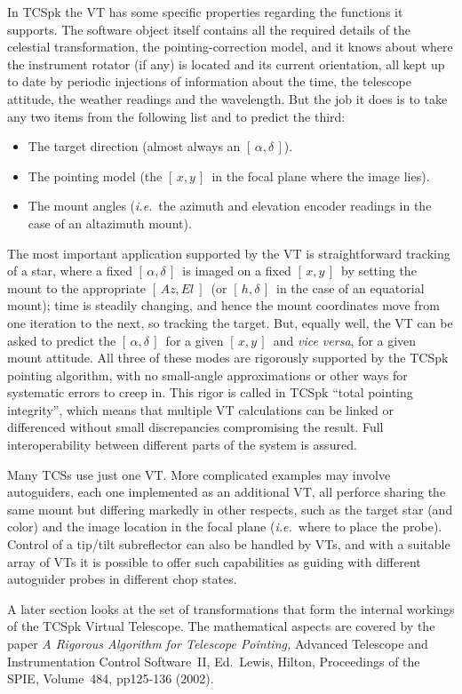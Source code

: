 \documentclass[12pt,fleqn,twoside]{article}
\renewcommand{\_}{{\tt\char'137}}     %
\newcommand{\radec}     {$[\,\alpha,\delta\,]$}
\newcommand{\hadec}     {$[\,h,\delta\,]$}
\newcommand{\azel}      {$[\,Az,El~]$}
\newcommand{\xy}        {$[\,x,y\,]$}
\begin{document}
In TCSpk the VT has some specific properties regarding
the functions it supports.  The software object itself contains all
the required details of the celestial transformation, the
pointing-correction model, and it knows about where the instrument
rotator (if any) is located and its current orientation, all kept
up to date by periodic injections of information about the time,
the telescope attitude, the weather readings and the wavelength.
But the job it
does is to take any two items from the following list and to
predict the third:
\begin{itemize}
\item The target direction (almost always an \radec).
\item The pointing model (the \xy\ in the focal plane where
      the image lies).
\item The mount angles ({\it i.e.}~the azimuth and elevation
      encoder readings in the case of an altazimuth mount).
\end{itemize}
The most important application supported by the VT
is straightforward tracking of a star, where a fixed \radec\ is
imaged on a fixed \xy\ by setting the mount to the appropriate
\azel\ (or \hadec\ in the case of an equatorial mount);  time is
steadily changing, and hence the mount coordinates move from one
iteration to the next, so tracking the target. But, equally well,
the VT can be asked to predict the \radec\ for a
given \xy\ and {\it vice versa}, for a given mount attitude.  All
three of these modes are rigorously supported by the TCSpk pointing
algorithm, with no small-angle approximations or other ways for
systematic errors to creep in.  This rigor is called in TCSpk
``total pointing integrity'', which means that multiple VT
calculations can be linked or differenced without small discrepancies
compromising the result.  Full interoperability between different
parts of the system is assured.

Many TCSs use just one VT.  More complicated examples may involve
autoguiders, each one implemented as an additional VT, all
perforce sharing the same mount but differing markedly in other
respects, such as the target star (and color) and the image
location in the focal plane
({\it i.e.}~where to place the probe). Control of a tip/tilt subreflector
can also be handled by VTs, and with a suitable array of VTs
it is possible to offer such capabilities as guiding with
different autoguider probes in different chop states.

A later section looks at the set of transformations that
form the internal workings of the TCSpk Virtual Telescope.  The
mathematical aspects are covered by the paper {\it A Rigorous
Algorithm for Telescope Pointing,}\/ Advanced Telescope and
Instrumentation Control Software~II, Ed.~Lewis, Hilton, Proceedings
of the SPIE, Volume~484, pp125-136 (2002).
\end{document}
